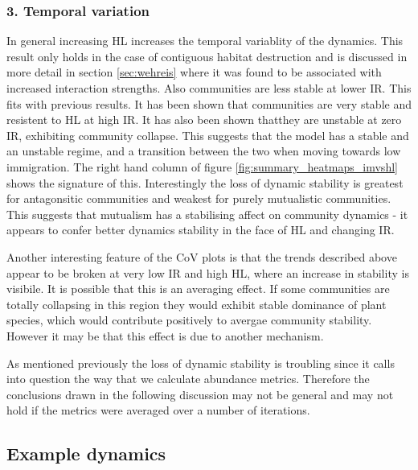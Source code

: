 \begin{itemize}
\subsubsection*{3. Temporal variation}
\label{sec:temp_var} 
In general increasing HL increases the temporal variablity of the dynamics. This result only holds in the case of contiguous habitat destruction and is discussed in more detail in section \ref{sec:wehreis} where it was found to be associated with increased interaction strengths. Also communities are less stable at lower IR. This fits with previous results. It has been shown that communities are very stable and resistent to HL at high IR. It has also been shown thatthey are unstable at zero IR, exhibiting community collapse. This suggests that the model has a stable and an unstable regime, and a transition between the two when moving towards low immigration. The right hand column of figure \ref{fig:summary_heatmaps_imvshl} shows the signature of this. Interestingly the loss of dynamic stability is greatest for antagonsitic communities and weakest for purely mutualistic communities. This suggests that mutualism has a stabilising affect on community dynamics - it appears to confer better dynamics stability in the face of HL and changing IR.

Another interesting feature of the CoV plots is that the trends described above appear to be broken at very low IR and high HL, where an increase in stability is visibile. It is possible that this is an averaging effect. If some communities are totally collapsing in this region they would exhibit stable dominance of plant species, which would contribute positively to avergae community stability. However it may be that this effect is due to another mechanism.

As mentioned previously the loss of dynamic stability is troubling since it calls into question the way that we calculate abundance metrics. Therefore the conclusions drawn in the following discussion may not be general and may not hold if the metrics were averaged over a number of iterations.
 
 
\newpage
\subsection{Example dynamics}
\label{sec:example_dynamics}


\end{itemize}
